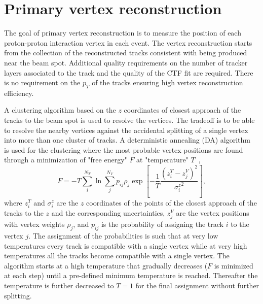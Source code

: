 \section{Primary vertex reconstruction}

The goal of primary vertex reconstruction is to measure the position of each proton-proton interaction vertex in each event. The vertex reconstruction starts from the collection of the reconstructed tracks consistent with being produced near the beam spot. Additional quality requirements on the number of tracker layers associated to the track and the quality of the CTF fit are required. There is no requirement on the $p_{T}$ of the tracks ensuring high vertex reconstruction efficiency.

A clustering algorithm based on the $z$ coordinates of closest approach of the tracks to the beam spot is used to resolve the vertices. The tradeoff is to be able to resolve the nearby vertices against the accidental splitting of a single vertex into more than one cluster of tracks.  A deterministic annealing (DA) algorithm~\cite{726788} is used for the clustering where the most probable vertex positions are found through a minimization of "free energy" $F$ at "temperature" $T$~\cite{Chatrchyan:2014fea}, 
\begin{equation} \label{eq:minimize}
F = -T \sum_{i}^{N_{T}} \ln \sum_{j}^{N_{V}} p_{ij} \rho_{j} \exp  \left[-\frac{1}{T}\frac{(z_{i}^{T}-z_{j}^{V})^2}{{\sigma_{i}^{z}}^2} \right],
\end{equation}
where $z_{i}^{T}$ and $\sigma_{i}^{z}$ are the $z$ coordinates of the points of the closest approach of the tracks to the $z$ and the corresponding uncertainties, $z_{j}^{V}$ are the vertex positions with vertex weights $\rho_{j}$, and $p_{ij}$ is the probability of assigning the track $i$ to the vertex $j$. The assignment of the probabilities is such that at very low temperatures every track is compatible with a single vertex while at very high temperatures all the tracks become compatible with a single vertex. The algorithm starts at a high temperature that gradually decreases ($F$ is minimized at each step) until a pre-defined minimum temperature is reached. Thereafter the temperature is further decreased to $T=1$ for the final assignment without further splitting. 

